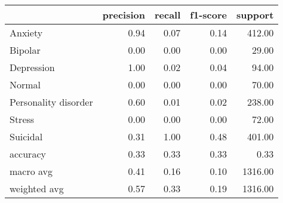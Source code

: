 \begin{tabular}{lrrrr}
\toprule
 & precision & recall & f1-score & support \\
\midrule
Anxiety & 0.94 & 0.07 & 0.14 & 412.00 \\
Bipolar & 0.00 & 0.00 & 0.00 & 29.00 \\
Depression & 1.00 & 0.02 & 0.04 & 94.00 \\
Normal & 0.00 & 0.00 & 0.00 & 70.00 \\
Personality disorder & 0.60 & 0.01 & 0.02 & 238.00 \\
Stress & 0.00 & 0.00 & 0.00 & 72.00 \\
Suicidal & 0.31 & 1.00 & 0.48 & 401.00 \\
accuracy & 0.33 & 0.33 & 0.33 & 0.33 \\
macro avg & 0.41 & 0.16 & 0.10 & 1316.00 \\
weighted avg & 0.57 & 0.33 & 0.19 & 1316.00 \\
\bottomrule
\end{tabular}
